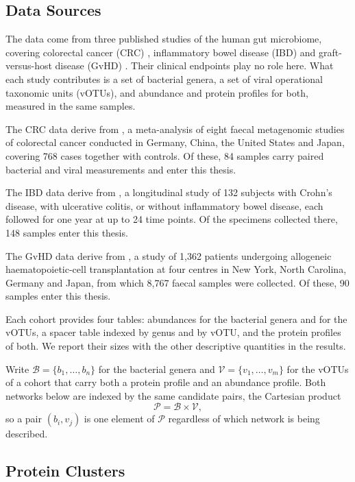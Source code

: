\subsection{Data Sources}
\label{data:sources}
The data come from three published studies of the human gut microbiome, covering colorectal cancer (CRC)
\citep{wirbel2019}, inflammatory bowel disease (IBD) \citep{lloydprice2019} and graft-versus-host disease
(GvHD) \citep{peled2020}. Their clinical endpoints play no role here. What each study contributes is a set
of bacterial genera, a set of viral operational taxonomic units (vOTUs), and abundance and protein
profiles for both, measured in the same samples.

The CRC data derive from \citet{wirbel2019}, a meta-analysis of eight faecal metagenomic studies of colorectal
cancer conducted in Germany, China, the United States and Japan, covering 768 cases together with controls. Of
these, 84 samples carry paired bacterial and viral measurements and enter this thesis.

The IBD data derive from \citet{lloydprice2019}, a longitudinal study of 132 subjects with Crohn's disease,
with ulcerative colitis, or without inflammatory bowel disease, each followed for one year at up to 24 time
points. Of the specimens collected there, 148 samples enter this thesis.

The GvHD data derive from \citet{peled2020}, a study of 1,362 patients undergoing allogeneic
haematopoietic-cell transplantation at four centres in New York, North Carolina, Germany and Japan, from which
8,767 faecal samples were collected. Of these, 90 samples enter this thesis.

Each cohort provides four tables: abundances for the bacterial genera and for the vOTUs, a spacer table
indexed by genus and by vOTU, and the protein profiles of both. We report their sizes with the other
descriptive quantities in the results.

Write \(\mathcal{B}=\{b_1,\ldots,b_n\}\) for the bacterial genera and
\(\mathcal{V}=\{v_1,\ldots,v_m\}\) for the vOTUs of a cohort that carry both a protein profile and an
abundance profile. Both networks below are indexed by the same candidate pairs, the Cartesian product
\begin{equation}\label{eq:pairs}
  \mathcal{P}=\mathcal{B}\times\mathcal{V},
\end{equation}
so a pair \((b_i,v_j)\) is one element of \(\mathcal{P}\) regardless of which network is being described.

\subsection{Protein Clusters}
\label{sec:mmseqs}

